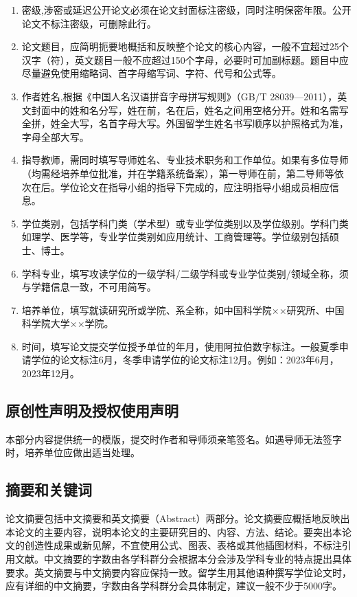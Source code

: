 \begin{enumerate}
    \item 密级,涉密或延迟公开论文必须在论文封面标注密级，同时注明保密年限。公开论文不标注密级，可删除此行。
    \item 论文题目，应简明扼要地概括和反映整个论文的核心内容，一般不宜超过25个汉字（符），英文题目一般不应超过150个字母，必要时可加副标题。题目中应尽量避免使用缩略词、首字母缩写词、字符、代号和公式等。
    \item 作者姓名,根据《中国人名汉语拼音字母拼写规则》（GB/T 28039—2011），英文封面中的姓和名分写，姓在前，名在后，姓名之间用空格分开。姓和名需写全拼，姓全大写，名首字母大写。外国留学生姓名书写顺序以护照格式为准，字母全部大写。
    \item 指导教师，需同时填写导师姓名、专业技术职务和工作单位。如果有多位导师（均需经培养单位批准，并在学籍系统备案），第一导师在前，第二导师等依次在后。学位论文在指导小组的指导下完成的，应注明指导小组成员相应信息。
    \item 学位类别，包括学科门类（学术型）或专业学位类别以及学位级别。学科门类如理学、医学等，专业学位类别如应用统计、工商管理等。学位级别包括硕士、博士。
    \item 学科专业，填写攻读学位的一级学科/二级学科或专业学位类别/领域全称，须与学籍信息一致，不可用简写。
    \item 培养单位，填写就读研究所或学院、系全称，如中国科学院××研究所、中国科学院大学××学院。
    \item 时间，填写论文提交学位授予单位的年月，使用阿拉伯数字标注。一般夏季申请学位的论文标注6月，冬季申请学位的论文标注12月。例如：2023年6月，2023年12月。
\end{enumerate}

\subsection{原创性声明及授权使用声明}
本部分内容提供统一的模版，提交时作者和导师须亲笔签名。如遇导师无法签字时，培养单位应做出适当处理。
\subsection{摘要和关键词}
论文摘要包括中文摘要和英文摘要（Abstract）两部分。论文摘要应概括地反映出本论文的主要内容，说明本论文的主要研究目的、内容、方法、结论。要突出本论文的创造性成果或新见解，不宜使用公式、图表、表格或其他插图材料，不标注引用文献。中文摘要的字数由各学科群分会根据本分会涉及学科专业的特点提出具体要求。英文摘要与中文摘要内容应保持一致。留学生用其他语种撰写学位论文时，应有详细的中文摘要，字数由各学科群分会具体制定，建议一般不少于5000字。

